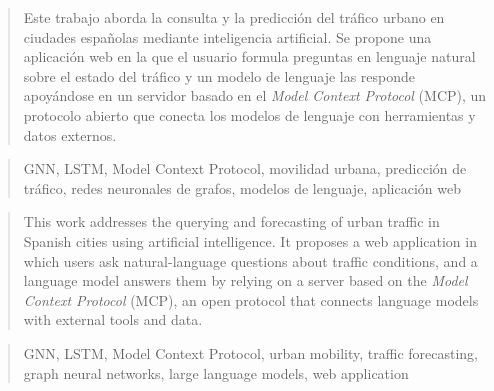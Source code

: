 \documentclass[a4paper,12pt,twoside]{memoir}
\begin{document}
\renewcommand*\abstractname{Resumen}
\begin{abstract}
Este trabajo aborda la consulta y la predicción del tráfico urbano en ciudades españolas mediante inteligencia artificial. Se propone una aplicación web en la que el usuario formula preguntas en lenguaje natural sobre el estado del tráfico y un modelo de lenguaje las responde apoyándose en un servidor basado en el \textit{Model Context Protocol} (MCP), un protocolo abierto que conecta los modelos de lenguaje con herramientas y datos externos.
\end{abstract}

\renewcommand*\abstractname{Descriptores}
\begin{abstract}
GNN, LSTM, Model Context Protocol, movilidad urbana, predicción de tráfico, redes neuronales de grafos, modelos de lenguaje, aplicación web
\end{abstract}

\clearpage

\renewcommand*\abstractname{Abstract}
\begin{abstract}
This work addresses the querying and forecasting of urban traffic in Spanish cities using artificial intelligence. It proposes a web application in which users ask natural-language questions about traffic conditions, and a language model answers them by relying on a server based on the \textit{Model Context Protocol} (MCP), an open protocol that connects language models with external tools and data.
\end{abstract}

\renewcommand*\abstractname{Keywords}
\begin{abstract}
GNN, LSTM, Model Context Protocol, urban mobility, traffic forecasting, graph neural networks, large language models, web application
\end{abstract}

\clearpage

\tableofcontents

\clearpage

\listoffigures

\clearpage

\listoftables
\clearpage

\mainmatter











\end{document}
